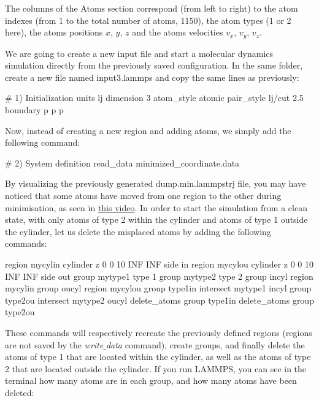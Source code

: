 \noindent The columns of the Atoms section
correspond (from left to right) to the atom indexes (from 1
to the total number of atoms, 1150), the atom types (1 or 2
here), the atoms positions $x$, $y$, $z$ and the
atoms velocities $v_x$, $v_y$, $v_z$.

We are going to create a new input file and start a
molecular dynamics simulation directly from the previously
saved configuration. In the same folder, create a new file
named input3.lammps and copy the same lines as previously:

\begin{lcverbatim}
# 1) Initialization
units lj
dimension 3
atom_style atomic
pair_style lj/cut 2.5
boundary p p p
\end{lcverbatim}

\noindent Now, instead of creating a new region and adding atoms, we
simply add the following command:

\begin{lcverbatim}
# 2) System definition
read_data minimized_coordinate.data
\end{lcverbatim}

\noindent By visualizing the previously generated dump.min.lammpstrj
file, you may have noticed that some atoms have moved from
one region to the other during minimisation, as seen in
\href{https://www.youtube.com/embed/gfJ_n33-F6A}{this video}.
In order to start the simulation from a clean state, with
only atoms of type 2 within the cylinder and atoms of type
1 outside the cylinder, let us delete the misplaced atoms
by adding the following commands:

\begin{lcverbatim}
region mycylin cylinder z 0 0 10 INF INF side in
region mycylou cylinder z 0 0 10 INF INF side out
group mytype1 type 1
group mytype2 type 2
group incyl region mycylin
group oucyl region mycylou
group type1in intersect mytype1 incyl
group type2ou intersect mytype2 oucyl
delete_atoms group type1in
delete_atoms group type2ou
\end{lcverbatim}

\noindent These commands will respectively recreate
the previously defined regions (regions are not saved by the
\textit{write$\_$data} command), create groups, and finally delete the
atoms of type 1 that are located within the cylinder, as
well as the atoms of type 2 that are located outside the
cylinder. If you run LAMMPS, you can see in the terminal how
many atoms are in each group, and how many atoms have been
deleted:

